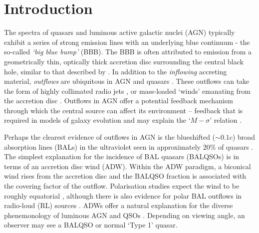 \documentclass[useAMS,usenatbib]{mn2e_x}
\begin{document}



%
%

\section{Introduction}

The spectra of 
quasars and luminous active galactic nuclei (AGN) 
typically exhibit a series of strong emission lines
with an underlying blue continuum - the so-called {\sl `big blue bump'} (BBB). 
The BBB is often attributed to emission from a 
geometrically thin, optically thick accretion disc surrounding the central black hole, similar
to that described by \cite{shakurasunyaev1973}.
In addition to the {\em inflowing} accreting material, 
{\em outflows} are ubiquitous in AGN
and quasars \citep{kellerman1989,ganguly2008}. These outflows can take the form of 
highly collimated radio jets \citep[e.g.][]{hazard1963,potash1980,perley1984,marscher2006}, 
or mass-loaded `winds' emanating from the accretion disc 
\citep{weymann1991,turnermiller2009}. 
Outflows in AGN offer a 
potential feedback mechanism through which the central source can 
affect its environment \citep{king2003,king2005,fabian2012}
-- feedback that is required in models of galaxy evolution \citep{springel2005}
and may explain the `$M-\sigma$' relation \citep{silkrees1998,haring2004}.

Perhaps the clearest evidence of outflows in AGN is  
the blueshifted ($\sim 0.1c$) broad absorption lines (BALs) in the 
ultraviolet seen in approximately $20\%$ of quasars
\citep{weymann1991, reichard2003, knigge2008, turnermiller2009, allen2011}.
The simplest explanation for the incidence of 
BAL quasars (BALQSOs) is in terms of an accretion disc wind (ADW). 
Within the ADW paradigm, a biconical wind rises from 
the accretion disc and the BALQSO fraction is associated with
the covering factor of the outflow. 
Polarisation studies expect the wind to be roughly equatorial
\citep{goodrich1995, cohen1995}, although there is also evidence
for polar BAL outflows  in radio-loud (RL) sources \citep{zhou2006}.
ADWs offer a natural explanation for the
diverse phenemonology of luminous AGN and QSOs \citep[e.g.][]{MCGV95, elvis2000}. 
Depending on viewing angle, an observer 
may see a BALQSO or normal `Type 1' quasar.
\end{document}
